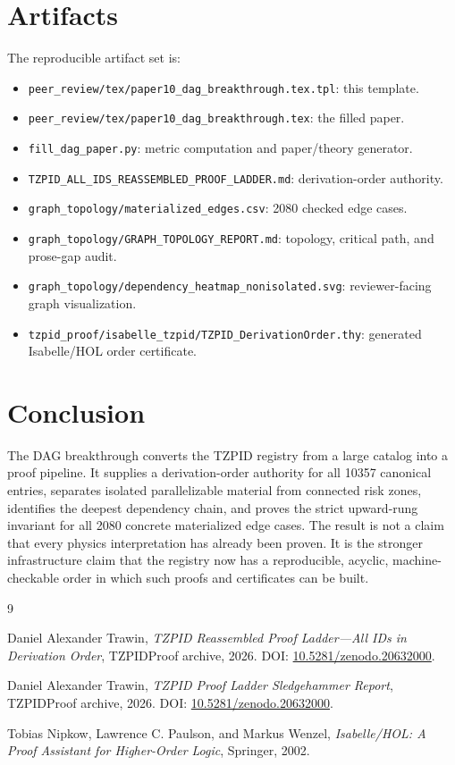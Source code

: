 \documentclass[11pt]{article}
\theoremstyle{remark}
\begin{document}
\section{Artifacts}
\label{sec:artifacts}

The reproducible artifact set is:

\begin{itemize}
  \item \texttt{peer\_review/tex/paper10\_dag\_breakthrough.tex.tpl}: this template.
  \item \texttt{peer\_review/tex/paper10\_dag\_breakthrough.tex}: the filled paper.
  \item \texttt{fill\_dag\_paper.py}: metric computation and paper/theory generator.
  \item \texttt{TZPID\_ALL\_IDS\_REASSEMBLED\_PROOF\_LADDER.md}: derivation-order authority.
  \item \texttt{graph\_topology/materialized\_edges.csv}: 2080 checked edge cases.
  \item \texttt{graph\_topology/GRAPH\_TOPOLOGY\_REPORT.md}: topology, critical path, and prose-gap audit.
  \item \texttt{graph\_topology/dependency\_heatmap\_nonisolated.svg}: reviewer-facing graph visualization.
  \item \texttt{tzpid\_proof/isabelle\_tzpid/TZPID\_DerivationOrder.thy}: generated Isabelle/HOL order certificate.
\end{itemize}

\section{Conclusion}
\label{sec:conclusion}

The DAG breakthrough converts the TZPID registry from a large catalog into a proof pipeline. It supplies a derivation-order authority for all 10357 canonical entries, separates isolated parallelizable material from connected risk zones, identifies the deepest dependency chain, and proves the strict upward-rung invariant for all 2080 concrete materialized edge cases. The result is not a claim that every physics interpretation has already been proven. It is the stronger infrastructure claim that the registry now has a reproducible, acyclic, machine-checkable order in which such proofs and certificates can be built.

\begin{thebibliography}{9}

Daniel Alexander Trawin,
\emph{TZPID Reassembled Proof Ladder---All IDs in Derivation Order},
TZPIDProof archive, 2026.
DOI: \href{https://doi.org/10.5281/zenodo.20632000}{10.5281/zenodo.20632000}.

Daniel Alexander Trawin,
\emph{TZPID Proof Ladder Sledgehammer Report},
TZPIDProof archive, 2026.
DOI: \href{https://doi.org/10.5281/zenodo.20632000}{10.5281/zenodo.20632000}.

Tobias Nipkow, Lawrence C. Paulson, and Markus Wenzel,
\emph{Isabelle/HOL: A Proof Assistant for Higher-Order Logic},
Springer, 2002.

\end{thebibliography}
\end{document}
